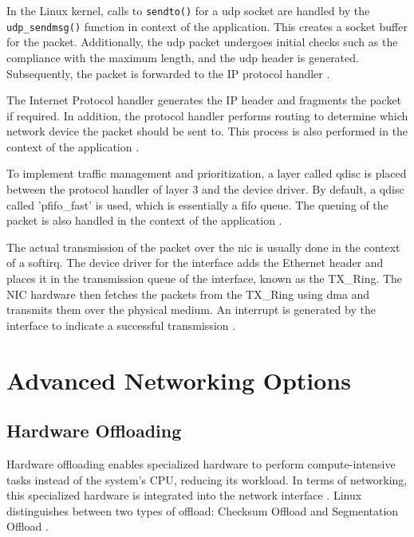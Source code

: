 In the Linux kernel, calls to \texttt{sendto()} for a \ac{udp} socket are handled by the \texttt{udp\_sendmsg()} function in context of the application. This creates a socket buffer for the packet. Additionally, the \ac{udp} packet undergoes initial checks such as the compliance with the maximum length, and the \ac{udp} header is generated. Subsequently, the packet is forwarded to the IP protocol handler \cite{lins01}.

The Internet Protocol handler generates the IP header and fragments the packet if required. In addition, the protocol handler performs routing to determine which network device the packet should be sent to. This process is also performed in the context of the application \cite{lins01, lins03}.

To implement traffic management and prioritization, a layer called \ac{qdisc} is placed between the protocol handler of layer 3 and the device driver. By default, a \ac{qdisc} called 'pfifo\_fast' is used, which is essentially a \ac{fifo} queue. The queuing of the packet is also handled in the context of the application \cite{lins03, lins12}.

The actual transmission of the packet over the \ac{nic} is usually done in the context of a softirq. The device driver for the interface adds the Ethernet header and places it in the transmission queue of the interface, known as the TX\_Ring. The NIC hardware then fetches the packets from the TX\_Ring using \ac{dma} and transmits them over the physical medium. An interrupt is generated by the interface to indicate a successful transmission \cite{lins06, lins14}.


\clearpage

\section{Advanced Networking Options}

\subsection{Hardware Offloading} \label{chap:HWOffload}
Hardware offloading enables specialized hardware to perform compute-intensive tasks instead of the system's \ac{CPU}, reducing its workload. In terms of networking, this specialized hardware is integrated into the network interface \cite{tuning01}. Linux distinguishes between two types of offload: Checksum Offload and Segmentation Offload \cite{tuning02, tuning03}.

